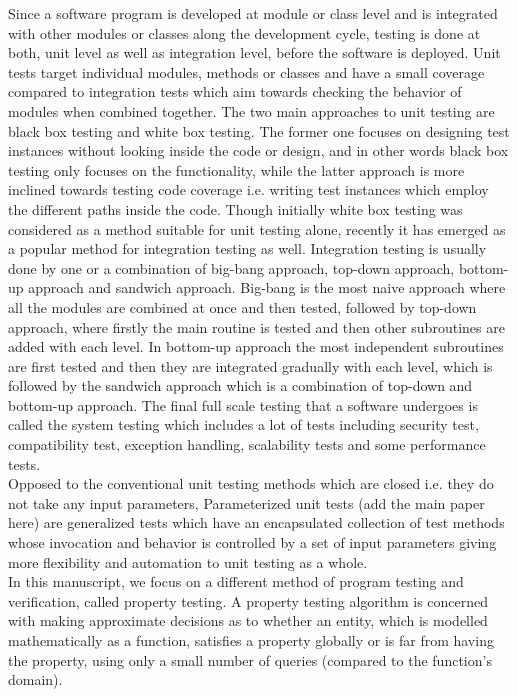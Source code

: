 Since a software program is developed at module or class level and is integrated with other modules or classes along the development cycle, testing is done at both, unit level as well as integration level, before the software is deployed. Unit tests target individual modules, methods or classes and have a small coverage compared to integration tests which aim towards checking the behavior of modules when combined together. The two main approaches to unit testing are black box testing and white box testing. The former one focuses on designing test instances without looking inside the code or design, and in other words black box testing only focuses on the functionality, while the latter approach is more inclined towards testing code coverage i.e. writing test instances which employ the different paths inside the code. Though initially white box testing was considered as a method suitable for unit testing alone, recently it has emerged as a popular method for integration testing as well. Integration testing is usually done by one or a combination of big-bang approach, top-down approach, bottom-up approach and sandwich approach. Big-bang is the most naive approach where all the modules are combined at once and then tested, followed by top-down approach, where firstly the main routine is tested and then other subroutines are added with each level. In bottom-up approach the most independent subroutines are first tested and then they are integrated gradually with each level, which is followed by the sandwich approach which is a combination of top-down and bottom-up approach. The final full scale testing that a software undergoes is called the system testing which includes a lot of tests including security test, compatibility test, exception handling, scalability tests and some performance tests. \\

Opposed to the conventional unit testing methods which are closed i.e. they do not take any input parameters, Parameterized unit tests (add the main paper here) %
are generalized tests which have an encapsulated collection of test methods whose invocation and behavior is controlled by a set of input parameters giving more flexibility and automation to unit testing as a whole. \\

In this manuscript, we focus on a different method of program testing and verification, called property testing. A property testing algorithm is concerned with making approximate decisions as to whether an entity, which is modelled mathematically as a function, satisfies a property globally or is far from having the property, using only a small number of queries (compared to the function's domain).\\
